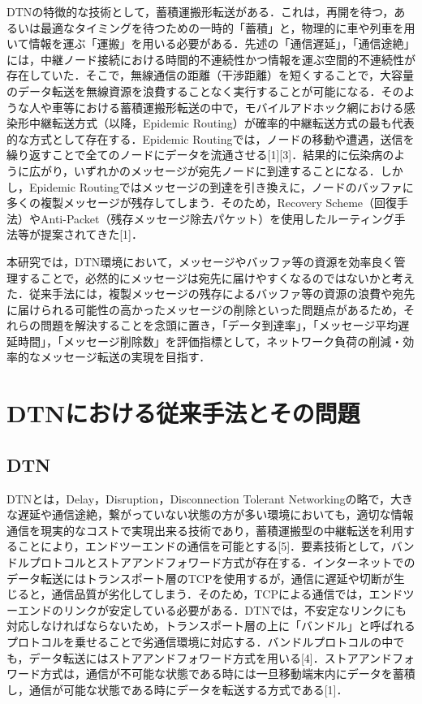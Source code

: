 \documentclass[11pt]{icsthesis}
\begin{document}
DTNの特徴的な技術として，蓄積運搬形転送がある．これは，再開を待つ，あるいは最適なタイミングを待つための一時的「蓄積」と，物理的に車や列車を用いて情報を運ぶ「運搬」を用いる必要がある．先述の「通信遅延」，「通信途絶」には，中継ノード接続における時間的不連続性かつ情報を運ぶ空間的不連続性が存在していた．そこで，無線通信の距離（干渉距離）を短くすることで，大容量のデータ転送を無線資源を浪費することなく実行することが可能になる．そのような人や車等における蓄積運搬形転送の中で，モバイルアドホック網における感染形中継転送方式（以降，Epidemic Routing）が確率的中継転送方式の最も代表的な方式として存在する．Epidemic Routingでは，ノードの移動や遭遇，送信を繰り返すことで全てのノードにデータを流通させる[1][3]．結果的に伝染病のように広がり，いずれかのメッセージが宛先ノードに到達することになる．しかし，Epidemic Routingではメッセージの到達を引き換えに，ノードのバッファに多くの複製メッセージが残存してしまう．そのため，Recovery Scheme（回復手法）やAnti-Packet（残存メッセージ除去パケット）を使用したルーティング手法等が提案されてきた[1]．

本研究では，DTN環境において，メッセージやバッファ等の資源を効率良く管理することで，必然的にメッセージは宛先に届けやすくなるのではないかと考えた．従来手法には，複製メッセージの残存によるバッファ等の資源の浪費や宛先に届けられる可能性の高かったメッセージの削除といった問題点があるため，それらの問題を解決することを念頭に置き，「データ到達率」，「メッセージ平均遅延時間」，「メッセージ削除数」を評価指標として，ネットワーク負荷の削減・効率的なメッセージ転送の実現を目指す．
\chapter{DTNにおける従来手法とその問題}
\section{DTN}
DTNとは，Delay，Disruption，Disconnection Tolerant Networkingの略で，大きな遅延や通信途絶，繋がっていない状態の方が多い環境においても，適切な情報通信を現実的なコストで実現出来る技術であり，蓄積運搬型の中継転送を利用することにより，エンドツーエンドの通信を可能とする[5]．要素技術として，バンドルプロトコルとストアアンドフォワード方式が存在する．インターネットでのデータ転送にはトランスポート層のTCPを使用するが，通信に遅延や切断が生じると，通信品質が劣化してしまう．そのため，TCPによる通信では，エンドツーエンドのリンクが安定している必要がある．DTNでは，不安定なリンクにも対応しなければならないため，トランスポート層の上に「バンドル」と呼ばれるプロトコルを乗せることで劣通信環境に対応する．バンドルプロトコルの中でも，データ転送にはストアアンドフォワード方式を用いる[4]．ストアアンドフォワード方式は，通信が不可能な状態である時には一旦移動端末内にデータを蓄積し，通信が可能な状態である時にデータを転送する方式である[1]．
\end{document}
